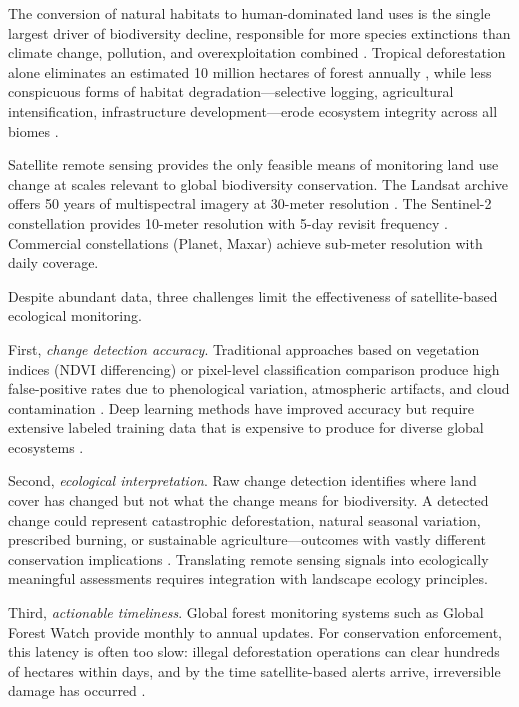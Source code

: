 \documentclass[11pt,a4paper]{article}
\begin{document}
The conversion of natural habitats to human-dominated land uses is the single largest driver of biodiversity decline, responsible for more species extinctions than climate change, pollution, and overexploitation combined \citep{maxwell2016biodiversity}.
Tropical deforestation alone eliminates an estimated 10 million hectares of forest annually \citep{fao2020global}, while less conspicuous forms of habitat degradation---selective logging, agricultural intensification, infrastructure development---erode ecosystem integrity across all biomes \citep{watson2018decline}.

Satellite remote sensing provides the only feasible means of monitoring land use change at scales relevant to global biodiversity conservation.
The Landsat archive offers 50 years of multispectral imagery at 30-meter resolution \citep{wulder2019current}.
The Sentinel-2 constellation provides 10-meter resolution with 5-day revisit frequency \citep{drusch2012sentinel}.
Commercial constellations (Planet, Maxar) achieve sub-meter resolution with daily coverage.

Despite abundant data, three challenges limit the effectiveness of satellite-based ecological monitoring.

First, \emph{change detection accuracy}.
Traditional approaches based on vegetation indices (NDVI differencing) or pixel-level classification comparison produce high false-positive rates due to phenological variation, atmospheric artifacts, and cloud contamination \citep{zhu2017change}.
Deep learning methods have improved accuracy but require extensive labeled training data that is expensive to produce for diverse global ecosystems \citep{yuan2021deep}.

Second, \emph{ecological interpretation}.
Raw change detection identifies where land cover has changed but not what the change means for biodiversity.
A detected change could represent catastrophic deforestation, natural seasonal variation, prescribed burning, or sustainable agriculture---outcomes with vastly different conservation implications \citep{redford2003empty}.
Translating remote sensing signals into ecologically meaningful assessments requires integration with landscape ecology principles.

Third, \emph{actionable timeliness}.
Global forest monitoring systems such as Global Forest Watch \citep{hansen2013high} provide monthly to annual updates.
For conservation enforcement, this latency is often too slow: illegal deforestation operations can clear hundreds of hectares within days, and by the time satellite-based alerts arrive, irreversible damage has occurred \citep{finer2018combating}.
\end{document}
